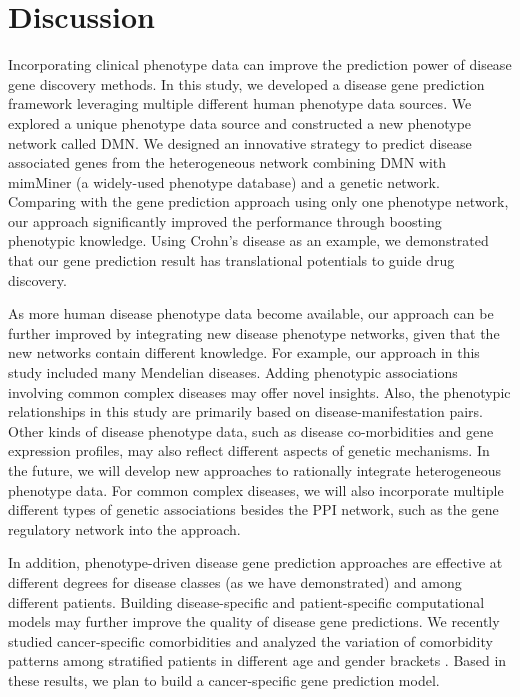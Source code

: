 \section{Discussion }
Incorporating clinical phenotype data
can improve the prediction power of disease gene discovery methods.
In this study, we developed a disease gene prediction framework
leveraging multiple different human phenotype data sources.
We explored a unique phenotype data source and
constructed a new phenotype network called DMN.
We designed an innovative strategy to predict disease associated genes
from the heterogeneous network combining DMN with mimMiner
(a widely-used phenotype database) and a genetic network.
Comparing with the gene prediction approach using only one phenotype network,
our approach significantly improved the performance through boosting phenotypic knowledge.
Using Crohn's disease as an example, we demonstrated that our gene prediction result
has translational potentials to guide drug discovery.


As more human
disease phenotype data become available,
our approach can be further improved by integrating
new disease phenotype networks, given that the new networks contain different
knowledge. For example, our approach in this study included
many Mendelian diseases. Adding phenotypic associations involving
common complex diseases may offer novel insights.
Also, the phenotypic relationships in this study are
primarily based on disease-manifestation pairs.
Other kinds of disease phenotype data,
such as disease co-morbidities and gene expression profiles,
may also reflect different aspects of genetic mechanisms.
In the future, we will develop new approaches to rationally
integrate heterogeneous phenotype data.
For common complex diseases, we will also incorporate
multiple different types of genetic
associations besides the PPI network, such as
the gene regulatory network into the approach.

In addition, phenotype-driven disease gene prediction approaches are
effective at different degrees for disease classes (as we have demonstrated)
and among different patients. Building disease-specific and patient-specific
computational models may further improve the quality
of disease gene predictions. We recently studied cancer-specific comorbidities
and analyzed the variation of comorbidity patterns among stratified patients in
different age and gender brackets \cite{chen2014network,chen2014mining}. Based in these results,
we plan to build a cancer-specific gene prediction model.


